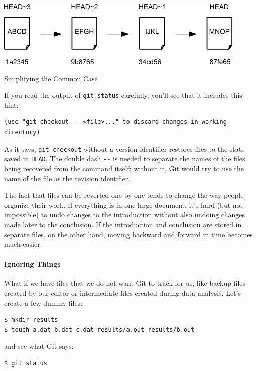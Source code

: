 \documentclass{book}
\begin{document}
\includegraphics{novice/git/img/git-when-revisions-updated.png}

\begin{swcbox}{Simplifying the Common Case}

If you read the output of \texttt{git status} carefully, you'll see that
it includes this hint:

\begin{verbatim}
(use "git checkout -- <file>..." to discard changes in working directory)
\end{verbatim}

As it says, \texttt{git checkout} without a version identifier restores
files to the state saved in \texttt{HEAD}. The double dash \texttt{-{}-}
is needed to separate the names of the files being recovered from the
command itself: without it, Git would try to use the name of the file as
the revision identifier.

\end{swcbox}

The fact that files can be reverted one by one tends to change the way
people organize their work. If everything is in one large document, it's
hard (but not impossible) to undo changes to the introduction without
also undoing changes made later to the conclusion. If the introduction
and conclusion are stored in separate files, on the other hand, moving
backward and forward in time becomes much easier.

\mbox{}\paragraph{Ignoring Things}

What if we have files that we do not want Git to track for us, like
backup files created by our editor or intermediate files created during
data analysis. Let's create a few dummy files:

\begin{verbatim}
$ mkdir results
$ touch a.dat b.dat c.dat results/a.out results/b.out
\end{verbatim}

and see what Git says:

\begin{verbatim}
$ git status
\end{verbatim}
\end{document}
